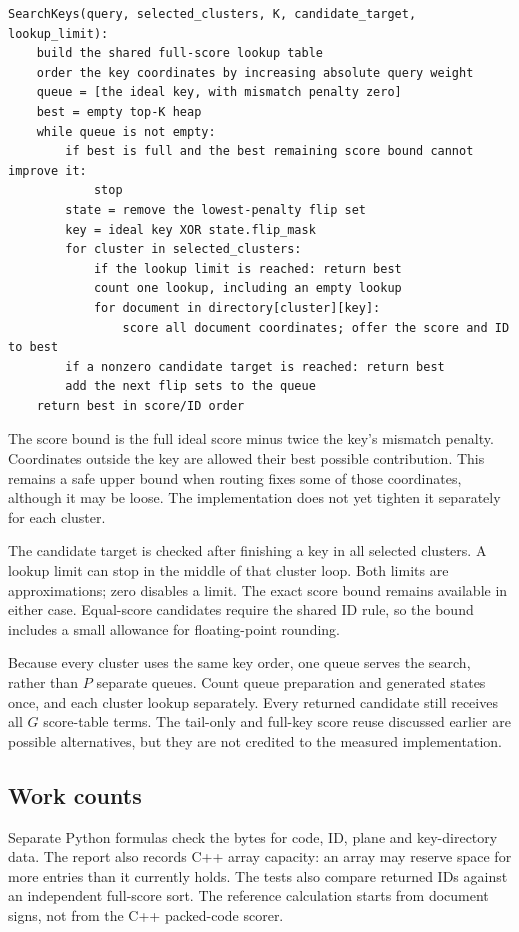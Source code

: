 \begin{lstlisting}[caption={The native key-search policy used in the measured study.}]
SearchKeys(query, selected_clusters, K, candidate_target, lookup_limit):
    build the shared full-score lookup table
    order the key coordinates by increasing absolute query weight
    queue = [the ideal key, with mismatch penalty zero]
    best = empty top-K heap
    while queue is not empty:
        if best is full and the best remaining score bound cannot improve it:
            stop
        state = remove the lowest-penalty flip set
        key = ideal key XOR state.flip_mask
        for cluster in selected_clusters:
            if the lookup limit is reached: return best
            count one lookup, including an empty lookup
            for document in directory[cluster][key]:
                score all document coordinates; offer the score and ID to best
        if a nonzero candidate target is reached: return best
        add the next flip sets to the queue
    return best in score/ID order
\end{lstlisting}
The score bound is the full ideal score minus twice the key's mismatch penalty. Coordinates
outside the key are allowed their best possible contribution. This remains a safe upper bound
when routing fixes some of those coordinates, although it may be loose. The implementation
does not yet tighten it separately for each cluster.

The candidate target is checked after finishing a key in all selected clusters. A lookup limit
can stop in the middle of that cluster loop. Both limits are approximations; zero disables a
limit. The exact score bound remains available in either case. Equal-score candidates require
the shared ID rule, so the bound includes a small allowance for floating-point rounding.

Because every cluster uses the same key order, one queue serves the search, rather than $P$
separate queues. Count queue preparation and generated states once, and each cluster lookup separately. Every returned candidate still receives all
$G$ score-table terms. The tail-only and full-key score reuse discussed earlier are possible
alternatives, but they are not credited to the measured implementation.

\subsection{Work counts}
Separate Python formulas check the bytes for code, ID, plane and key-directory data.
The report also records C++ array capacity: an array may reserve space for more entries than
it currently holds. The tests also compare returned IDs against an independent full-score sort.
The reference calculation starts from document signs, not from the C++ packed-code scorer.

